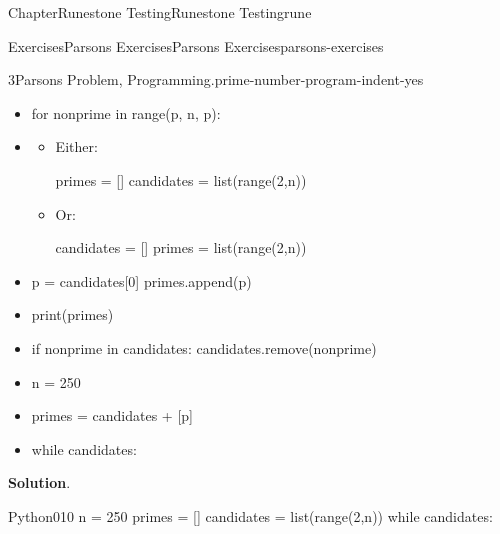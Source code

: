 \documentclass[oneside,10pt,]{book}
\newcommand{\blocktitlefont}{\relax}
\numberwithin{equation}{section}
\begin{document}
\begin{chapterptx}{Chapter}{Runestone Testing}{}{Runestone Testing}{}{}{rune}
\begin{exercises-section}{Exercises}{Parsons Exercises}{}{Parsons Exercises}{}{}{parsons-exercises}
\begin{divisionexercise}{3}{Parsons Problem, Programming.}{}{prime-number-program-indent-yes}
\par
%
\begin{itemize}[label=\textbullet]
\item{}%
\begin{codedisplayleft}
for nonprime in range(p, n, p):
\end{codedisplayleft}
%
\item{}%
\begin{itemize}[label=]
\item{}Either:%
\par
%
\begin{codedisplay}
primes = []
candidates = list(range(2,n))
\end{codedisplay}
%
\item{}Or:%
\par
%
\begin{codedisplay}
candidates = []
primes = list(range(2,n))
\end{codedisplay}
%
\end{itemize}
%
\item{}%
\begin{codedisplayleft}
p = candidates[0]
primes.append(p)
\end{codedisplayleft}
%
\item{}%
\begin{codedisplayleft}
print(primes)
\end{codedisplayleft}
%
\item{}%
\begin{codedisplayleft}
if nonprime in candidates:
    candidates.remove(nonprime)
\end{codedisplayleft}
%
\item{}%
\begin{codedisplayleft}
n = 250
\end{codedisplayleft}
%
\item{}%
\begin{codedisplayleft}
primes = candidates + [p]
\end{codedisplayleft}
%
\item{}%
\begin{codedisplayleft}
while candidates:
\end{codedisplayleft}
%
\end{itemize}
%
\par\smallskip%
\noindent\textbf{\blocktitlefont Solution}.\hypertarget{prime-number-program-indent-yes-5}{}\quad{}\begin{program}{Python}{0}{1}{0}
n = 250
primes = []
candidates = list(range(2,n))
while candidates:

\end{program}
\end{divisionexercise}
\end{exercises-section}
\end{chapterptx}
\end{document}
